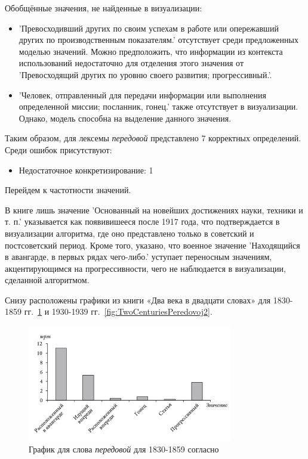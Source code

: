 Обобщённые значения, не найденные в визуализации:
\begin{itemize}
    \item ’Превосходивший других по своим успехам в работе или опережавший других по производственным показателям.’
отсутствует среди предложенных моделью значений.
Можно предположить, что информации из контекста использований недостаточно для отделения этого значения от
’Превосходящий других по уровню своего развития; прогрессивный.’. %

    \item ’Человек, отправленный для передачи информации или выполнения определенной миссии; посланник, гонец.’ также отсутствует в визуализации.
Однако, модель способна на выделение данного значения.
\end{itemize}

Таким образом, для лексемы \textit{передовой} представлено 7 корректных определений.
Среди ошибок присутствуют:
\begin{itemize}
    \item Недостаточное конкретизирование: 1
\end{itemize}

Перейдем к частотности значений.

В книге лишь значение ’Основанный на новейших достижениях науки, техники и т. п.’
указывается как появивишееся после 1917 года, что подтверждается
в визуализации алгоритма, где оно представлено только в советский и постсоветский период.
Кроме того, указано, что военное значение ’Находящийся в авангарде, в первых рядах чего-либо.’
уступает переносным значениям, акцентирующимся на прогрессивности, чего
не наблюдается в визуализации, сделанной алгоритмом.

Снизу расположены графики из книги «Два века в двадцати словах»
для 1830-1859 гг.~\ref{fig:TwoCenturiesPeredovoj1} и 1930-1939 гг.~\ref{fig:TwoCenturiesPeredovoj2}.

\noindent %
\begin{figure}[H]
    \centering %
    \includegraphics[width=0.8\textwidth]{img/book/peredovoj/1830-1859}
    \caption{График для слова \textit{передовой} для 1830-1859 согласно~\cite{TwoCenturies}}
    \label{fig:TwoCenturiesPeredovoj1}
\end{figure}

